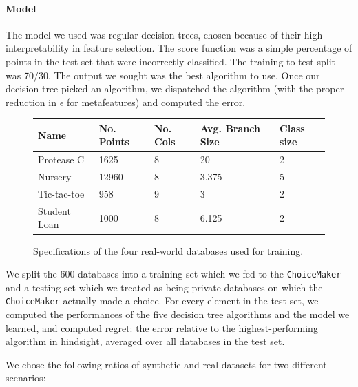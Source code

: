 \documentclass[11pt]{report}
\renewcommand{\t}[1]{\texttt{#1}}
\begin{document}
\paragraph{Model} 
The model we used was regular decision trees, chosen because of their high interpretability in feature selection. The score function was a simple percentage of points in the test set that were incorrectly classified. The training to test split was 70/30. The output we sought was the best algorithm to use. Once our decision tree picked an algorithm, we dispatched the algorithm (with the proper reduction in $\epsilon$ for metafeatures) and computed the error.
\begin{figure}
\begin{center}
\begin{tabular}{|p{3cm}|l|l|l|l|}
\hline
Name & No. Points & No. Cols & Avg. Branch Size & Class size \\ \hline
Protease C & 1625 & 8 & 20 & 2 \\ \hline
Nursery & 12960 & 8 & 3.375 & 5 \\ \hline
Tic-tac-toe & 958 & 9 & 3 & 2 \\ \hline
Student Loan & 1000 & 8 & 6.125 & 2 \\ \hline
\end{tabular}
\end{center}
\caption{Specifications of the four real-world databases used for training.}\label{fig:dbinfo}
\end{figure}

We split the 600 databases into a training set which we fed to the \t{ChoiceMaker} and a testing set which we treated as being private databases on which the \t{ChoiceMaker} actually made a choice. For every element in the test set, we computed the performances of the five decision tree algorithms and the model we learned, and computed regret: the error relative to the highest-performing algorithm in hindsight, averaged over all databases in the test set.

We chose the following ratios of synthetic and real datasets for two different scenarios:
\end{document}
